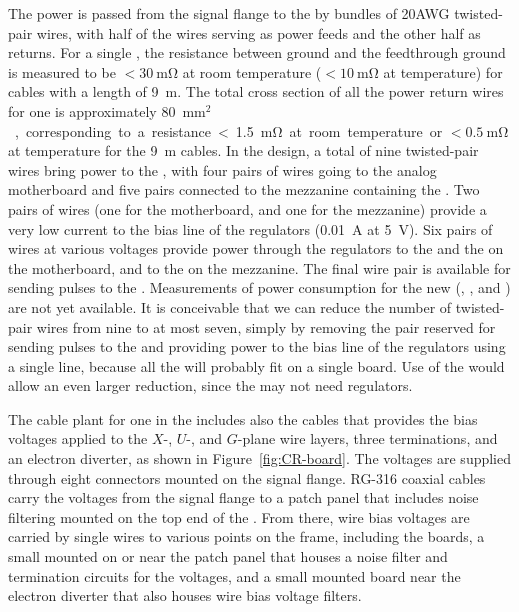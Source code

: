 The  power is passed from the signal flange to the 
 by bundles of \num{20}AWG twisted-pair wires, with half of
the wires serving as power feeds and the other half as returns.
For a single , the resistance between  ground
and the feedthrough ground is measured to be 
$<\SI{30}{\milli\ohm}$ at room temperature ($<\SI{10}{\milli\ohm}$ 
at  temperature) for cables with a length of \SI{9}{m}. 
The total cross section of all the power return wires for one
 is approximately \SI{80}{mm$^2$}, corresponding to a
resistance <\SI{1.5}{\milli\ohm} at room temperature or 
$<\SI{0.5}{\milli\ohm}$ at  temperature for the
\SI{9}{m} cables.
In the  design, %
a total of nine 
twisted-pair wires %
bring power to the
, with four pairs of wires going to the analog
motherboard and five pairs connected to the mezzanine containing
the . Two pairs of wires (one for the motherboard,
and one for the mezzanine) %
provide a very low
current to the bias line of the  regulators 
(\SI{0.01}{A} at \SI{5}{V}). Six pairs of wires at %
various voltages %
provide power through the
 regulators to the  and the 
on the motherboard, and to the  on the mezzanine.
The final wire pair is available for sending pulses to the
. %
Measurements 
of power consumption for the new  (, 
, and ) are not yet available.  It is conceivable that we can  reduce the number of twisted-pair
wires from %
nine %
to at most seven, simply by removing the pair
reserved for sending pulses to the  and %
providing power to the bias
line of the  regulators using a single line, 
because all the  will probably fit on a single board.  
Use of the  would allow an even larger reduction, %
since the  may not need  regulators. 

The cable plant for one  in the  includes
also the cables that provides the bias voltages applied to the $X$-, $U$-, and $G$-plane 
wire layers, three  terminations, and an electron diverter, 
as shown in Figure~\ref{fig:CR-board}. The voltages are supplied 
through eight  connectors mounted on the signal flange. 
RG-316 coaxial cables carry the voltages from the signal flange to 
a patch panel  that includes noise filtering mounted on the top 
end of the . From there, wire bias voltages are carried by single wires to 
various points on the  frame, including the  
boards, a small  mounted on or near the patch panel that 
houses a noise filter and termination circuits for the   
voltages, and a small mounted board near the electron diverter 
that also houses wire bias voltage filters.

